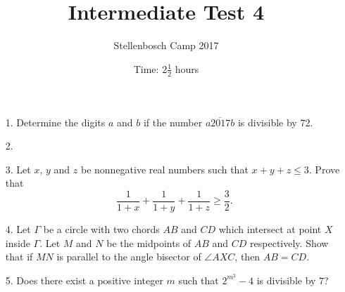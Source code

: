 \documentclass[12pt]{article}
\title{Intermediate Test 4}
\author{Stellenbosch Camp 2017}
\date{Time: $2\frac{1}{2}$ hours}
\begin{document}
 \maketitle

\begin{enumerate}

\item[1.] %
Determine the digits $a$ and $b$ if the number $\overline{a2017b}$ is divisible by 72.


\item[2.] %


\item[3.] %
Let $x$, $y$ and $z$ be nonnegative real numbers such that $x+y+z \leq 3$. Prove that
	\[ \frac{1}{1+x} +\frac{1}{1+y} +\frac{1}{1+z} \geq \frac{3}{2}. \]


\item[4.] %
Let $\Gamma$ be a circle with two chords $AB$ and $CD$ which intersect at point $X$ inside $\Gamma$. Let $M$ and $N$ be the midpoints of $AB$ and $CD$ respectively. Show that if $MN$ is parallel to the angle bisector of $\angle AXC$, then $AB = CD$.
 

\item[5.] %
Does there exist a positive integer $m$ such that $2^{m^2} - 4$ is divisible by $7$?


\end{enumerate}
\end{document}

